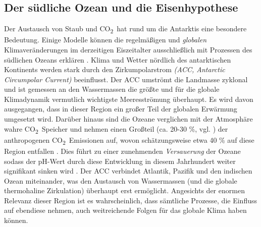 \documentclass[12pt,a4paper,onecolumn,draft]{scrartcl}
\newcommand{\cotwo}{CO\textsubscript{2}}
\begin{document}
\subsection{Der südliche Ozean und die Eisenhypothese} \label{sec:Eisenhypothese}
Der Austausch von Staub und \cotwo \ hat rund um die Antarktis eine besondere Bedeutung. Einige Modelle können die regelmäßigen und \textit{globalen} Klimaveränderungen im derzeitigen Eiszeitalter  ausschließlich mit Prozessen des südlichen Ozeans erklären \citep{Fischer.2010}. Klima und Wetter nördlich des antarktischen Kontinents werden stark durch den  Zirkumpolarstrom \textit{(ACC, Antarctic Circumpolar Current)} beeinflusst. Der ACC umströmt die Landmasse zyklonal und ist gemessen an den Wassermassen die größte und für die globale Klimadynamik vermutlich wichtigste Meeresströmung überhaupt. Es wird davon ausgegangen, dass in dieser Region ein großer Teil der globalen Erwärmung umgesetzt wird. Darüber hinaus sind die Ozeane verglichen mit der Atmosphäre wahre \cotwo \ Speicher und nehmen einen Großteil (ca. 20-30 \%, vgl. \citep{IPCCpol.2019}) der anthropogenen \cotwo \ Emissionen auf, wovon schätzungsweise etwa 40 \% auf diese Region entfallen \citep{Boning.2008}. Dies führt zu einer zunehmenden \textit{Versauerung} der Ozeane sodass der pH-Wert durch diese Entwicklung in diesem Jahrhundert weiter signifikant sinken wird \citep{IPCCpol.2019}. Der ACC verbindet Atlantik, Pazifik und den indischen Ozean miteinander, was den Austausch von Wassermassen (und die globale thermohaline Zirkulation) überhaupt erst ermöglicht. Angesichts der enormen Relevanz dieser Region ist es wahrscheinlich, dass sämtliche Prozesse, die Einfluss auf ebendiese nehmen, auch weitreichende Folgen für das globale Klima haben können. \\
\end{document}
